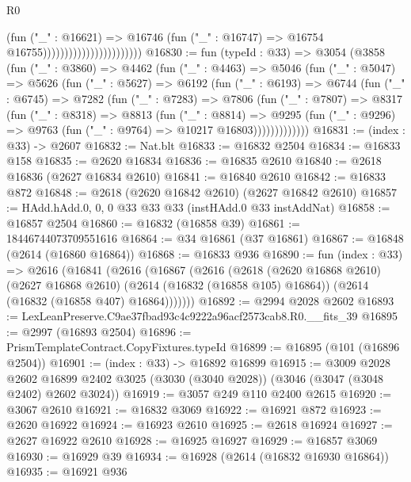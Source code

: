 \begin{lexlean}{R0}
\begin{coremodule}
                                              (fun ("_" : @16621) =>
                                              @16746
                                                (fun ("_" : @16747) =>
                                                @16754 @16755)))))))))))))))))))))))
@16830 := fun (typeId : @33) =>
  @3054
    (@3858
      (fun ("_" : @3860) =>
      @4462
        (fun ("_" : @4463) =>
        @5046
          (fun ("_" : @5047) =>
          @5626
            (fun ("_" : @5627) =>
            @6192
              (fun ("_" : @6193) =>
              @6744
                (fun ("_" : @6745) =>
                @7282
                  (fun ("_" : @7283) =>
                  @7806
                    (fun ("_" : @7807) =>
                    @8317
                      (fun ("_" : @8318) =>
                      @8813
                        (fun ("_" : @8814) =>
                        @9295
                          (fun ("_" : @9296) =>
                          @9763 (fun ("_" : @9764) => @10217 @16803)))))))))))))
@16831 := (index : @33) -> @2607
@16832 := Nat.blt
@16833 := @16832 @2504
@16834 := @16833 @158
@16835 := @2620 @16834
@16836 := @16835 @2610
@16840 := @2618 @16836 (@2627 @16834 @2610)
@16841 := @16840 @2610
@16842 := @16833 @872
@16848 := @2618 (@2620 @16842 @2610) (@2627 @16842 @2610)
@16857 := HAdd.hAdd.{0, 0, 0} @33 @33 @33 (instHAdd.{0} @33 instAddNat)
@16858 := @16857 @2504
@16860 := @16832 (@16858 @39)
@16861 := 18446744073709551616
@16864 := @34 @16861 (@37 @16861)
@16867 := @16848 (@2614 (@16860 @16864))
@16868 := @16833 @936
@16890 := fun (index : @33) =>
  @2616
    (@16841
      (@2616
        (@16867
          (@2616
            (@2618
              (@2620 @16868 @2610)
              (@2627 @16868 @2610)
              (@2614 (@16832 (@16858 @105) @16864))
              (@2614 (@16832 (@16858 @407) @16864)))))))
@16892 := @2994 @2028 @2602
@16893 := LexLeanPreserve.C9ae37fbad93c4c9222a96acf2573cab8.R0.__fits_39
@16895 := @2997 (@16893 @2504)
@16896 := PrismTemplateContract.CopyFixtures.typeId
@16899 := @16895 (@101 (@16896 @2504))
@16901 := (index : @33) -> @16892 @16899
@16915 := @3009
    @2028
    @2602
    @16899
    @2402
    @3025
    (@3030 (@3040 @2028))
    (@3046 (@3047 (@3048 @2402) @2602 @3024))
@16919 := @3057 @249 @110 @2400 @2615
@16920 := @3067 @2610
@16921 := @16832 @3069
@16922 := @16921 @872
@16923 := @2620 @16922
@16924 := @16923 @2610
@16925 := @2618 @16924
@16927 := @2627 @16922 @2610
@16928 := @16925 @16927
@16929 := @16857 @3069
@16930 := @16929 @39
@16934 := @16928 (@2614 (@16832 @16930 @16864))
@16935 := @16921 @936

\end{coremodule}
\end{lexlean}
